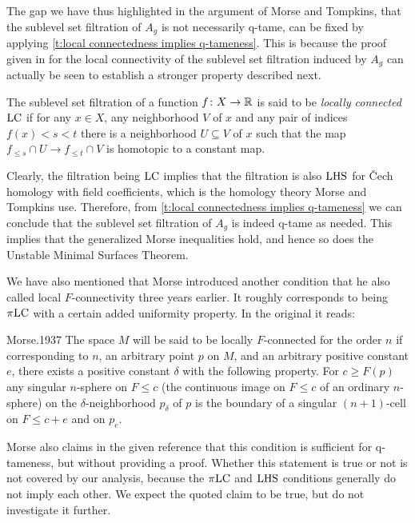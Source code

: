 The gap we have thus highlighted in the argument of Morse and Tompkins, that the sublevel set filtration of $A_g$ is not necessarily q-tame, can be fixed by applying \cref{t:local connectedness implies q-tameness}.
This is because the proof given in \cite[p.464]{Morse.1939} for the local connectivity of the sublevel set filtration induced by $A_g$ can actually be seen to establish a stronger property described next.

\begin{defi}
	The sublevel set filtration of a function $f \colon X \to \mathbb{R}$ is said to be \emph{locally connected} $\mathrm{LC}$ if for any $x \in X$, any neighborhood $V$ of $x$ and any pair of indices $f(x) < s < t$ there is a neighborhood $U \subseteq V$ of $x$ such that the map $f_{\leq s} \cap U \to f_{\leq t} \cap V$ is homotopic to a constant map.
\end{defi}

Clearly, the filtration being $\mathrm{LC}$ implies that the filtration is also $\mathrm{LHS}$ for \v{C}ech homology with field coefficients, which is the homology theory Morse and Tompkins use.
Therefore, from \cref{t:local connectedness implies q-tameness} we can conclude that the sublevel set filtration of $A_g$ is indeed \mbox{q-tame} as needed.
This implies that the generalized Morse inequalities hold, and hence so does the Unstable Minimal Surfaces Theorem.

We have also mentioned that Morse introduced another condition that he also called local $F$-connectivity three years earlier.
It roughly corresponds to being $\pi\mathrm{LC}$ with a certain added uniformity property.
In the original it reads:
\begin{displaycquote}[p.421--422]{Morse.1937}
	The space $M$ will be said to be locally $F$-connected for the order $n$ if corresponding to $n$, an arbitrary point $p$ on $M$, and an arbitrary positive constant $e$, there exists a positive constant $\delta$ with the following property.
	For $c \geq F(p)$ any singular $n$-sphere on $F \leq c$ (the continuous image on $F \leq c$ of an ordinary $n$-sphere) on the $\delta$-neighborhood $p_{\delta}$ of $p$ is the boundary of a singular $(n + 1)$-cell on $F \leq c + e$ and on $p_e$.
\end{displaycquote}
Morse also claims in the given reference that this condition is sufficient for q-tameness, but without providing a proof.
Whether this statement is true or not is not covered by our analysis, because the $\pi\mathrm{LC}$ and $\mathrm{LHS}$ conditions generally do not imply each other.
We expect the quoted claim to be true, but do not investigate it further.
